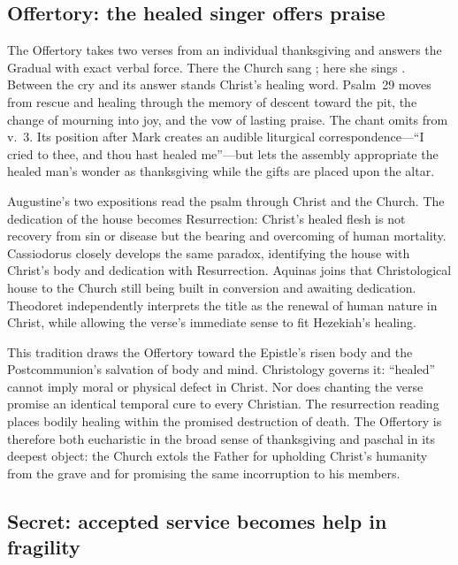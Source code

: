 \subsection*{Offertory: the healed singer offers praise\enspace{}}

The Offertory takes two verses from an individual thanksgiving and answers the
Gradual with exact verbal force. There the Church sang ; here she sings . Between
the cry and its answer stands Christ's healing word. Psalm~29
moves from rescue and healing through the memory of descent toward the pit,
the change of mourning into joy, and the vow of lasting praise. The chant
omits  from v.~3. Its position after Mark creates an audible
liturgical correspondence---``I cried to thee, and thou hast healed me''---but
lets the assembly appropriate the healed man's wonder as thanksgiving while
the gifts are placed upon the altar.

Augustine's two expositions read the psalm through Christ and the Church.
The dedication of the house becomes Resurrection: Christ's healed flesh is
not recovery from sin or disease but the bearing and overcoming of human
mortality. Cassiodorus closely develops the same paradox, identifying the
house with Christ's body and dedication with Resurrection. Aquinas joins that
Christological house to the Church still being built in conversion and
awaiting dedication. Theodoret independently interprets the title as the
renewal of human nature in Christ, while allowing the verse's immediate sense
to fit Hezekiah's healing.

This tradition draws the Offertory toward the Epistle's risen body and the
Postcommunion's salvation of body and mind. Christology governs it:
``healed'' cannot imply moral or physical defect in Christ. Nor does chanting
the verse promise an identical temporal cure to every Christian. The
resurrection reading places bodily healing within the promised destruction of
death. The Offertory is therefore both eucharistic in the broad sense of
thanksgiving and paschal in its deepest object: the Church extols the Father
for upholding Christ's humanity from the grave and for promising the same
incorruption to his members.

\subsection*{Secret: accepted service becomes help in fragility\enspace{}}

